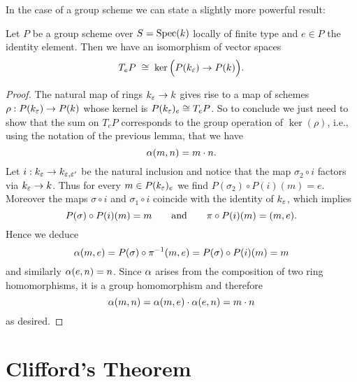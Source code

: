 	In the case of a group scheme we can state a slightly more powerful result:
	\begin{lemm}\label{lemm:tng_grp_sch}
		Let $P$ be a group scheme over $S=\operatorname{Spec}(k)$ locally of finite type and $e\in P$ the identity element. Then we have an isomorphism of vector spaces
		$$ T_e P \;\cong\; \ker \Big( P(k_\varepsilon) \to P(k) \Big). $$
	\end{lemm}
	\begin{proof}
		The natural map of rings $k_\varepsilon \to k$ gives rise to a map of schemes $\rho: P(k_\varepsilon) \to P(k)$ whose kernel is $P(k_\varepsilon)_e \cong T_e P$. So to conclude we just need to show that the sum on $T_eP$ corresponds to the group operation of $\ker(\rho)$, i.e., using the notation of the previous lemma, that we have
		$$ \alpha(m,n)= m \cdot n. $$
		Let $i:k_\varepsilon \to k_{\varepsilon,\varepsilon'}$ be the natural inclusion and notice that the map $\sigma_2 \circ i$ factors via $k_\varepsilon\to k$. Thus for every $m\in P(k_\varepsilon)_e$ we find $P(\sigma_2)\circ P(i)(m)=e$. Moreover the maps $\sigma\circ i$ and $\sigma_1\circ i$ coincide with the identity of $k_\varepsilon$, which implies
		$$ P(\sigma)\circ P(i)(m)=m \qquad \text{and} \qquad \pi\circ P(i)(m) = (m,e). $$
		Hence we deduce
		$$ \alpha(m,e) = P(\sigma)\circ \pi^{-1}(m,e) = P(\sigma)\circ P(i)(m) = m $$
		and similarly $\alpha(e,n) = n$. Since $\alpha$ arises from the composition of two ring homomorphisms, it is a group homomorphism and therefore
		$$ \alpha(m,n) = \alpha(m,e)\cdot\alpha(e,n) = m\cdot n $$
		as desired.
	\end{proof}

\section{Clifford's Theorem}

